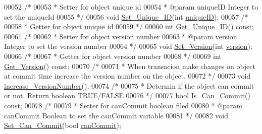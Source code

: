 \begin{DoxyCode}
00052     \textcolor{comment}{/*}
00053 \textcolor{comment}{     * Setter for object unique id}
00054 \textcolor{comment}{     * @param uniqueID Integer to set the uniqueId}
00055 \textcolor{comment}{     */}
00056     \textcolor{keywordtype}{void} \hyperlink{class_o_s_t_m_ab5019a32185631c08abbf826422f2d93_ab5019a32185631c08abbf826422f2d93}{Set\_Unique\_ID}(\textcolor{keywordtype}{int} \hyperlink{class_o_s_t_m_aa9fe59368b701af7f70befa23bd6901a_aa9fe59368b701af7f70befa23bd6901a}{uniqueID});
00057     \textcolor{comment}{/*}
00058 \textcolor{comment}{     * Getter for object unique id}
00059 \textcolor{comment}{     */}
00060     \textcolor{keywordtype}{int} \hyperlink{class_o_s_t_m_a5a01a8b98d16b1d1904ecf9356e7b71d_a5a01a8b98d16b1d1904ecf9356e7b71d}{Get\_Unique\_ID}() \textcolor{keyword}{const};
00061     \textcolor{comment}{/*}
00062 \textcolor{comment}{     * Setter for object version number}
00063 \textcolor{comment}{     * @param version Integer to set the version number}
00064 \textcolor{comment}{     */}
00065     \textcolor{keywordtype}{void} \hyperlink{class_o_s_t_m_a9529ad8d6d28c1f0cc9b86ed91df1ae1_a9529ad8d6d28c1f0cc9b86ed91df1ae1}{Set\_Version}(\textcolor{keywordtype}{int} \hyperlink{class_o_s_t_m_a9a6ea36181be2db7f9082d77956511d7_a9a6ea36181be2db7f9082d77956511d7}{version});
00066     \textcolor{comment}{/*}
00067 \textcolor{comment}{     * Getter for object version number}
00068 \textcolor{comment}{     */}
00069     \textcolor{keywordtype}{int} \hyperlink{class_o_s_t_m_a1f1db9d482f22c8e7caa17dfb340626b_a1f1db9d482f22c8e7caa17dfb340626b}{Get\_Version}() \textcolor{keyword}{const};
00070     \textcolor{comment}{/*}
00071 \textcolor{comment}{     * When transacion make changes on object at commit time increase the version number on the object.}
00072 \textcolor{comment}{     */}
00073     \textcolor{keywordtype}{void} \hyperlink{class_o_s_t_m_a5f90caa4384d371c16b7cac860d9f89a_a5f90caa4384d371c16b7cac860d9f89a}{increase\_VersionNumber}();
00074     \textcolor{comment}{/*}
00075 \textcolor{comment}{     * Determin if the object can commit or not. Return boolean TRUE/FALSE}
00076 \textcolor{comment}{     */}
00077     \textcolor{keywordtype}{bool} \hyperlink{class_o_s_t_m_a8df39ced3b401aa466df97e26d14b1b7_a8df39ced3b401aa466df97e26d14b1b7}{Is\_Can\_Commit}() \textcolor{keyword}{const};
00078     \textcolor{comment}{/*}
00079 \textcolor{comment}{     * Setter for canCommit boolean filed}
00080 \textcolor{comment}{     * @param canCommit Boolean to set the canCommit variable}
00081 \textcolor{comment}{     */}
00082     \textcolor{keywordtype}{void} \hyperlink{class_o_s_t_m_a813ee61c9d1c83c6a6ae30d12aca8a5d_a813ee61c9d1c83c6a6ae30d12aca8a5d}{Set\_Can\_Commit}(\textcolor{keywordtype}{bool} \hyperlink{class_o_s_t_m_a2a5b89641af274ddc69bdf8c1c1a07d6_a2a5b89641af274ddc69bdf8c1c1a07d6}{canCommit});

\end{DoxyCode}
